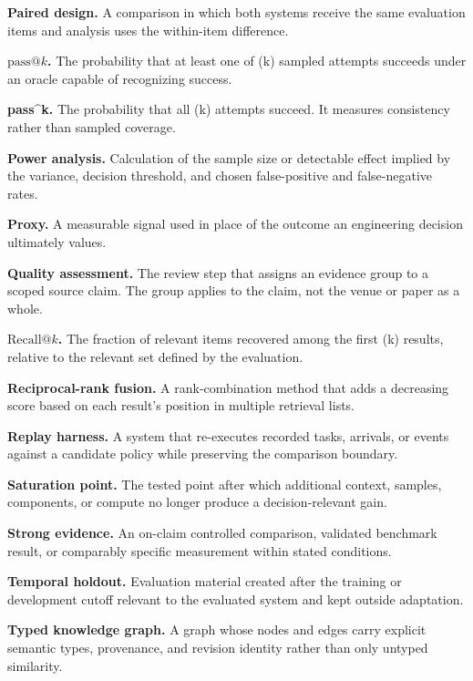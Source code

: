 \textbf{Paired design.} A comparison in which both systems receive the same evaluation items and analysis uses the within-item difference.

\textbf{\(\mathrm{pass}@k\).} The probability that at least one of (k) sampled attempts succeeds under an oracle capable of recognizing success.

\textbf{pass\^{}k.} The probability that all (k) attempts succeed. It measures consistency rather than sampled coverage.

\textbf{Power analysis.} Calculation of the sample size or detectable effect implied by the variance, decision threshold, and chosen false-positive and false-negative rates.

\textbf{Proxy.} A measurable signal used in place of the outcome an engineering decision ultimately values.

\textbf{Quality assessment.} The review step that assigns an evidence group to a scoped source claim. The group applies to the claim, not the venue or paper as a whole.

\textbf{\(\mathrm{Recall}@k\).} The fraction of relevant items recovered among the first (k) results, relative to the relevant set defined by the evaluation.

\textbf{Reciprocal-rank fusion.} A rank-combination method that adds a decreasing score based on each result's position in multiple retrieval lists.

\textbf{Replay harness.} A system that re-executes recorded tasks, arrivals, or events against a candidate policy while preserving the comparison boundary.

\textbf{Saturation point.} The tested point after which additional context, samples, components, or compute no longer produce a decision-relevant gain.

\textbf{Strong evidence.} An on-claim controlled comparison, validated benchmark result, or comparably specific measurement within stated conditions.

\textbf{Temporal holdout.} Evaluation material created after the training or development cutoff relevant to the evaluated system and kept outside adaptation.

\textbf{Typed knowledge graph.} A graph whose nodes and edges carry explicit semantic types, provenance, and revision identity rather than only untyped similarity.
